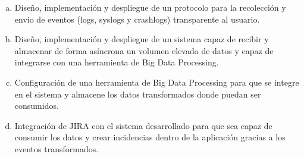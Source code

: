 \begin{enumerate}[a)]
	\item Diseño, implementación y despliegue de un protocolo para la recolección y envío de eventos (logs, syslogs y crashlogs) transparente al usuario.
	
	\item Diseño, implementación y despliegue de un sistema capaz de recibir y almacenar de forma asíncrona un volumen elevado de datos y capaz de integrarse con una herramienta de Big Data Processing.
	
	\item Configuración de una herramienta de Big Data Processing para que se integre en el sistema y almacene los datos transformados donde puedan ser consumidos.
	
	\item Integración de JIRA con el sistema desarrollado para que sea capaz de consumir los datos y crear incidencias dentro de la aplicación gracias a los eventos transformados.
\end{enumerate}

